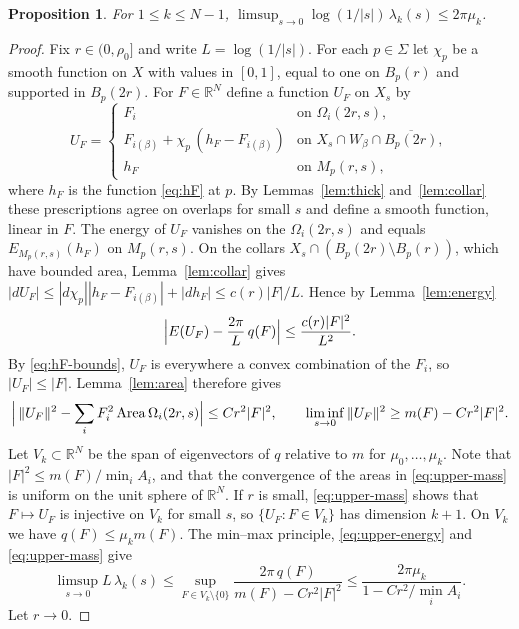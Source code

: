 \documentclass[11pt]{amsart}
\newtheorem{proposition}[theorem]{Proposition}
\theoremstyle{definition}
\theoremstyle{remark}
\newcommand{\RR}{\mathbb R}
\newcommand{\area}{\operatorname{Area}}
\begin{document}
\begin{proposition}\label{prop:upper}
For $1\le k\le N-1$,
$\limsup_{s\to0}\log(1/|s|)\,\lambda_k(s)\le2\pi\mu_k$.
\end{proposition}
\begin{proof}
Fix $r\in(0,\rho_0]$ and write $L=\log(1/|s|)$. For each $p\in\Sigma$ let
$\chi_p$ be a smooth function on $X$ with values in $[0,1]$, equal to one
on $B_p(r)$ and supported in $B_p(2r)$. For $F\in\RR^N$ define a function
$U_F$ on $X_s$ by
\[
 U_F=\begin{cases}
 F_i&\text{on }\Omega_i(2r,s),\\
 F_{i(\beta)}+\chi_p\,(h_F-F_{i(\beta)})&\text{on }X_s\cap W_\beta\cap
     \overline{B_p(2r)},\\
 h_F&\text{on }M_p(r,s),
 \end{cases}
\]
where $h_F$ is the function \eqref{eq:hF} at $p$. By
Lemmas~\ref{lem:thick} and~\ref{lem:collar} these prescriptions agree on
overlaps for small $s$ and define a smooth function, linear in $F$. The
energy of $U_F$ vanishes on the $\Omega_i(2r,s)$ and equals
$E_{M_p(r,s)}(h_F)$ on $M_p(r,s)$. On the collars
$X_s\cap(B_p(2r)\setminus B_p(r))$, which have bounded area,
Lemma~\ref{lem:collar} gives
$|dU_F|\le|d\chi_p||h_F-F_{i(\beta)}|+|dh_F|\le c(r)|F|/L$. Hence by
Lemma~\ref{lem:energy}
\begin{equation}\label{eq:upper-energy}
 \Bigl|E(U_F)-\frac{2\pi}{L}\,q(F)\Bigr|\le\frac{c(r)|F|^2}{L^2}.
\end{equation}
By \eqref{eq:hF-bounds}, $U_F$ is everywhere a convex combination of the
$F_i$, so $|U_F|\le|F|$. Lemma~\ref{lem:area} therefore
gives
\begin{equation}\label{eq:upper-mass}
 \Bigl|\,\|U_F\|^2-\sum_iF_i^2\area\Omega_i(2r,s)\Bigr|\le Cr^2|F|^2,
 \qquad
 \liminf_{s\to0}\|U_F\|^2\ge m(F)-Cr^2|F|^2 .
\end{equation}
Let $V_k\subset\RR^N$ be the span of eigenvectors of $q$ relative to $m$
for $\mu_0,\ldots,\mu_k$. Note that $|F|^2\le m(F)/\min_iA_i$, and that the convergence of
the areas in \eqref{eq:upper-mass} is uniform on the unit sphere of
$\RR^N$. If $r$ is small, \eqref{eq:upper-mass} shows
that $F\mapsto U_F$ is injective on $V_k$ for small $s$, so
$\{U_F:F\in V_k\}$ has dimension $k+1$. On $V_k$ we have
$q(F)\le\mu_km(F)$. The min--max principle,
\eqref{eq:upper-energy} and \eqref{eq:upper-mass} give
\[
 \limsup_{s\to0}L\,\lambda_k(s)
 \le\sup_{F\in V_k\setminus\{0\}}\frac{2\pi\,q(F)}{m(F)-Cr^2|F|^2}
 \le\frac{2\pi\mu_k}{1-Cr^2/\min_iA_i}.
\]
Let $r\to0$.
\end{proof}
\end{document}
